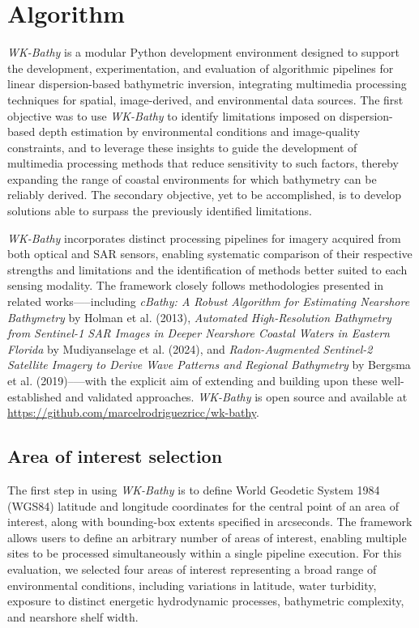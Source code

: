 \documentclass[12pt]{article}
\begin{document}
\section{Algorithm}
\textit{WK-Bathy} is a modular Python development environment designed to support the development, experimentation, and evaluation of algorithmic pipelines for linear dispersion-based bathymetric inversion, integrating multimedia processing techniques for spatial, image-derived, and environmental data sources. The first objective was to use \textit{WK-Bathy} to identify limitations imposed on dispersion-based depth estimation by environmental conditions and image-quality constraints, and to leverage these insights to guide the development of multimedia processing methods that reduce sensitivity to such factors, thereby expanding the range of coastal environments for which bathymetry can be reliably derived. The secondary objective, yet to be accomplished, is to develop solutions able to surpass the previously identified limitations.

\textit{WK-Bathy} incorporates distinct processing pipelines for imagery acquired from both optical and SAR sensors, enabling systematic comparison of their respective strengths and limitations and the identification of methods better suited to each sensing modality. The framework closely follows methodologies presented in related works—--including \textit{cBathy: A Robust Algorithm for Estimating Nearshore Bathymetry} by Holman et al. (2013), \textit{Automated High-Resolution Bathymetry from Sentinel-1 SAR Images in Deeper Nearshore Coastal Waters in Eastern Florida} by Mudiyanselage et al. (2024), and \textit{Radon-Augmented Sentinel-2 Satellite Imagery to Derive Wave Patterns and Regional Bathymetry} by Bergsma et al. (2019)--—with the explicit aim of extending and building upon these well-established and validated approaches. \textit{WK-Bathy} is open source and available at \href{https://github.com/marcelrodriguezricc/wk-bathy}{https://github.com/marcelrodriguezricc/wk-bathy}.

\subsection{Area of interest selection}
The first step in using \textit{WK-Bathy} is to define World Geodetic System 1984 (WGS84) latitude and longitude coordinates for the central point of an area of interest, along with bounding-box extents specified in arcseconds. The framework allows users to define an arbitrary number of areas of interest, enabling multiple sites to be processed simultaneously within a single pipeline execution. For this evaluation, we selected four areas of interest representing a broad range of environmental conditions, including variations in latitude, water turbidity, exposure to distinct energetic hydrodynamic processes, bathymetric complexity, and nearshore shelf width.
\end{document}
